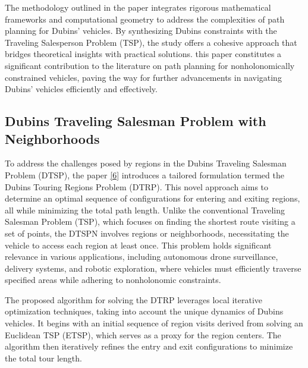 \vspace*{6mm}

The methodology outlined in the paper integrates rigorous mathematical frameworks and computational geometry to address the complexities of path planning for Dubins’ vehicles. By synthesizing Dubins constraints with the Traveling Salesperson Problem (TSP), the study offers a cohesive approach that bridges theoretical insights with practical solutions. this paper constitutes a significant contribution to the literature on path planning for nonholonomically constrained vehicles, paving the way for further advancements in navigating Dubins’ vehicles efficiently and effectively.











\subsection{Dubins Traveling Salesman Problem with Neighborhoods}

To address the challenges posed by regions in the Dubins Traveling Salesman Problem (DTSP), the paper \hyperlink{cite.DTSPN}{[6]} introduces a tailored formulation termed the Dubins Touring Regions Problem (DTRP). This novel approach aims to determine an optimal sequence of configurations for entering and exiting regions, all while minimizing the total path length. Unlike the conventional Traveling Salesman Problem (TSP), which focuses on finding the shortest route visiting a set of points, the DTSPN involves regions or neighborhoods, necessitating the vehicle to access each region at least once. This problem holds significant relevance in various applications, including autonomous drone surveillance, delivery systems, and robotic exploration, where vehicles must efficiently traverse specified areas while adhering to nonholonomic constraints.

\vspace*{6mm}

The proposed algorithm for solving the DTRP leverages local iterative optimization techniques, taking into account the unique dynamics of Dubins vehicles. It begins with an initial sequence of region visits derived from solving an Euclidean TSP (ETSP), which serves as a proxy for the region centers. The algorithm then iteratively refines the entry and exit configurations to minimize the total tour length.

